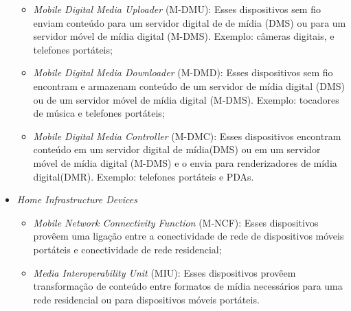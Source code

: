 \begin{itemize}
\begin{itemize}
		\item \emph{Mobile Digital Media Uploader} (M-DMU): Esses dispositivos sem fio enviam conteúdo para um servidor digital de de mídia (DMS) ou para um servidor móvel de mídia digital (M-DMS). Exemplo: câmeras digitais, e telefones portáteis;
		\item \emph{Mobile Digital Media Downloader} (M-DMD): Esses dispositivos sem fio encontram e armazenam conteúdo de um servidor de mídia digital (DMS) ou de um servidor móvel de mídia digital (M-DMS). Exemplo: tocadores de música e telefones portáteis;
		\item \emph{Mobile Digital Media Controller} (M-DMC): Esses dispositivos encontram conteúdo em um servidor digital de mídia(DMS) ou em um servidor móvel de mídia digital (M-DMS) e o envia para renderizadores de mídia digital(DMR). Exemplo: telefones portáteis e PDAs.
	\end{itemize}
	\item \emph{Home Infrastructure Devices}
	\begin{itemize}
		\item \emph{Mobile Network Connectivity Function} (M-NCF): Esses dispositivos provêem uma ligação entre a conectividade de rede de dispositivos móveis portáteis e conectividade de rede residencial;
		\item \emph{Media Interoperability Unit} (MIU): Esses dispositivos provêem transformação de conteúdo entre formatos de mídia necessários para uma rede residencial ou para dispositivos móveis portáteis.
	\end{itemize}
\end{itemize}

